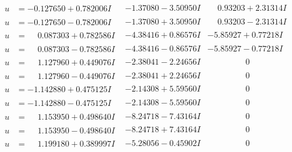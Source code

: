 \documentclass[1p]{elsarticle_modified}
\theoremstyle{definition}
\begin{document}
$$\begin{array}{c|c|c}
\begin{aligned}
u &= -0.127650 + 0.782006 I\end{aligned}
 & -1.37080 - 3.50950 I & \phantom{-}0.93203 + 2.31314 I \\ \hline\begin{aligned}
u &= -0.127650 - 0.782006 I\end{aligned}
 & -1.37080 + 3.50950 I & \phantom{-}0.93203 - 2.31314 I \\ \hline\begin{aligned}
u &= \phantom{-}0.087303 + 0.782586 I\end{aligned}
 & -4.38416 + 0.86576 I & -5.85927 + 0.77218 I \\ \hline\begin{aligned}
u &= \phantom{-}0.087303 - 0.782586 I\end{aligned}
 & -4.38416 - 0.86576 I & -5.85927 - 0.77218 I \\ \hline\begin{aligned}
u &= \phantom{-}1.127960 + 0.449076 I\end{aligned}
 & -2.38041 - 2.24656 I & \phantom{-0.000000 } 0 \\ \hline\begin{aligned}
u &= \phantom{-}1.127960 - 0.449076 I\end{aligned}
 & -2.38041 + 2.24656 I & \phantom{-0.000000 } 0 \\ \hline\begin{aligned}
u &= -1.142880 + 0.475125 I\end{aligned}
 & -2.14308 + 5.59560 I & \phantom{-0.000000 } 0 \\ \hline\begin{aligned}
u &= -1.142880 - 0.475125 I\end{aligned}
 & -2.14308 - 5.59560 I & \phantom{-0.000000 } 0 \\ \hline\begin{aligned}
u &= \phantom{-}1.153950 + 0.498640 I\end{aligned}
 & -8.24718 - 7.43164 I & \phantom{-0.000000 } 0 \\ \hline\begin{aligned}
u &= \phantom{-}1.153950 - 0.498640 I\end{aligned}
 & -8.24718 + 7.43164 I & \phantom{-0.000000 } 0 \\ \hline\begin{aligned}
u &= \phantom{-}1.199180 + 0.389997 I\end{aligned}
 & -5.28056 - 0.45902 I & \phantom{-0.000000 } 0 \\ \hline\begin{aligned}

\end{aligned}
\end{array}$$
\end{document}
